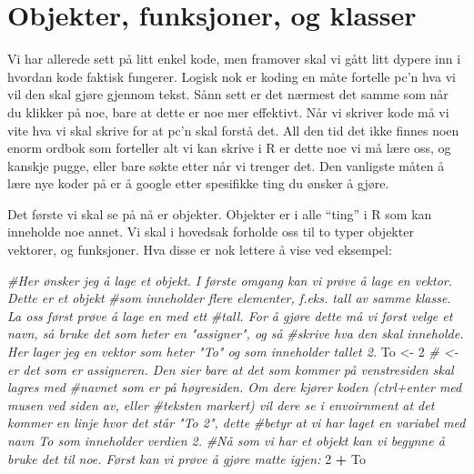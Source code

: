 \documentclass[
]{article}
\newenvironment{Shaded}{\begin{snugshade}}{\end{snugshade}}
\newcommand{\CommentTok}[1]{\textcolor[rgb]{0.56,0.35,0.01}{\textit{#1}}}
\newcommand{\DecValTok}[1]{\textcolor[rgb]{0.00,0.00,0.81}{#1}}
\newcommand{\NormalTok}[1]{#1}
\newcommand{\OperatorTok}[1]{\textcolor[rgb]{0.81,0.36,0.00}{\textbf{#1}}}
\newcommand{\StringTok}[1]{\textcolor[rgb]{0.31,0.60,0.02}{#1}}
\begin{document}
\hypertarget{objekter-funksjoner-og-klasser}{%
\section{Objekter, funksjoner, og
klasser}\label{objekter-funksjoner-og-klasser}}

Vi har allerede sett på litt enkel kode, men framover skal vi gått litt
dypere inn i hvordan kode faktisk fungerer. Logisk nok er koding en måte
fortelle pc'n hva vi vil den skal gjøre gjennom tekst. Sånn sett er det
nærmest det samme som når du klikker på noe, bare at dette er noe mer
effektivt. Når vi skriver kode må vi vite hva vi skal skrive for at pc'n
skal forstå det. All den tid det ikke finnes noen enorm ordbok som
forteller alt vi kan skrive i R er dette noe vi må lære oss, og kanskje
pugge, eller bare søkte etter når vi trenger det. Den vanligste måten å
lære nye koder på er å google etter spesifikke ting du ønsker å gjøre.

Det første vi skal se på nå er objekter. Objekter er i alle ``ting'' i R
som kan inneholde noe annet. Vi skal i hovedsak forholde oss til to
typer objekter vektorer, og funksjoner. Hva disse er nok lettere å vise
ved eksempel:

\begin{Shaded}
\begin{Highlighting}[]
\CommentTok{#Her ønsker jeg å lage et objekt. I første omgang kan vi prøve å lage en vektor. Dette er et objekt}
\CommentTok{#som inneholder flere elementer, f.eks. tall av samme klasse. La oss først prøve å lage en med ett}
\CommentTok{#tall. For å gjøre dette må vi først velge et navn, så bruke det som heter en "assigner", og så}
\CommentTok{#skrive hva den skal inneholde. Her lager jeg en vektor som heter "To" og som inneholder tallet 2. }
\NormalTok{To <-}\StringTok{ }\DecValTok{2}
\CommentTok{# <- er det som er assigneren. Den sier bare at det som kommer på venstresiden skal lagres med }
\CommentTok{#navnet som er på høyresiden. Om dere kjører koden (ctrl+enter med musen ved siden av, eller}
\CommentTok{#teksten markert) vil dere se i envoirnment at det kommer en linje hvor det står "To   2", dette}
\CommentTok{#betyr at vi har laget en variabel med navn To som inneholder verdien 2. }
\CommentTok{#Nå som vi har et objekt kan vi begynne å bruke det til noe. Først kan vi prøve å gjøre matte igjen:}
\DecValTok{2} \OperatorTok{+}\StringTok{ }\NormalTok{To }
\end{Highlighting}
\end{Shaded}
\end{document}
